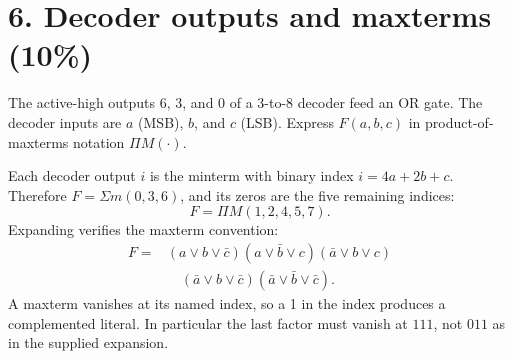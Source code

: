\section{6. Decoder outputs and maxterms (10\%)}
\begin{question}
The active-high outputs 6, 3, and 0 of a 3-to-8 decoder feed an OR gate. The decoder inputs are $a$ (MSB), $b$, and $c$ (LSB). Express $F(a,b,c)$ in product-of-maxterms notation $\Pi M(\cdot)$.
\begin{center}
\end{center}
\end{question}
\begin{solution}
Each decoder output $i$ is the minterm with binary index $i=4a+2b+c$. Therefore $F=\Sigma m(0,3,6)$, and its zeros are the five remaining indices:
\[
\boxed{F=\Pi M(1,2,4,5,7).}
\]
Expanding verifies the maxterm convention:
\begin{align*}
F={}&(a\vee b\vee\bar c)(a\vee\bar b\vee c)
(\bar a\vee b\vee c)\\
&\quad(\bar a\vee b\vee\bar c)(\bar a\vee\bar b\vee\bar c).
\end{align*}
A maxterm vanishes at its named index, so a 1 in the index produces a complemented literal. In particular the last factor must vanish at $111$, not $011$ as in the supplied expansion.
\end{solution}

